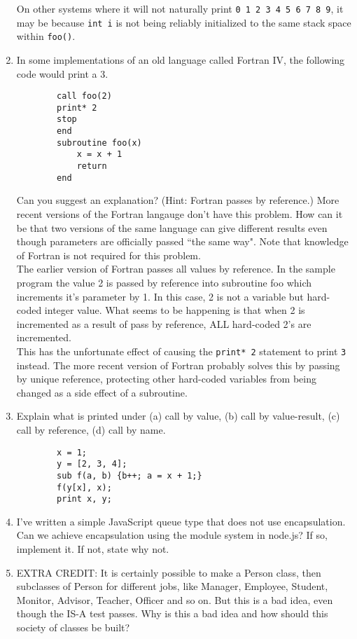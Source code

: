 \documentclass{article}
\begin{document}
\begin{enumerate}
	On other systems where it will not naturally print \texttt{0 1 2 3 4 5 6 7 8 9}, it may be because \texttt{int i} is not being reliably initialized to the same stack space within \texttt{foo()}.
	
	\setcounter{enumi}{7}
	\pagebreak
	\item In some implementations of an old language called Fortran IV, the following code would print a 3. 
	\begin{verbatim} 
	    call foo(2)
	    print* 2
	    stop
	    end
	    subroutine foo(x)
	        x = x + 1
	        return
	    end
    \end{verbatim}
	Can you suggest an explanation? (Hint: Fortran passes by reference.) More recent versions of the Fortran langauge don't have this problem. How can it be that two versions of the same language can give different results even though parameters are officially passed ``the same way". Note that knowledge of Fortran is not required for this problem.\\[.25in]
	The earlier version of Fortran passes all values by reference. In the sample program the value 2 is passed by reference into subroutine foo which increments it's parameter by 1. In this case, 2 is not a variable but hard-coded integer value. What seems to be happening is that when 2 is incremented as a result of pass by reference, ALL hard-coded 2's are incremented. \\[.1in]
	This has the unfortunate effect of causing the \texttt{print* 2} statement to print \texttt{3} instead. The more recent version of Fortran probably solves this by passing by unique reference, protecting other hard-coded variables from being changed as a side effect of a subroutine.
	\setcounter{enumi}{9}
	\pagebreak
	\item Explain what is printed under (a) call by value, (b) call by value-result, (c) call by reference, (d) call by name.
	\begin{verbatim}
		x = 1;
		y = [2, 3, 4];
		sub f(a, b) {b++; a = x + 1;}
		f(y[x], x);
		print x, y;
	\end{verbatim}
	\pagebreak
	\item I've written a simple JavaScript queue type that does not use encapsulation. Can we achieve encapsulation using the module system in node.js? If so, implement it. If not, state why not.
	\pagebreak
	\item EXTRA CREDIT: It is certainly possible to make a Person class, then subclasses of Person for different jobs, like Manager, Employee, Student, Monitor, Advisor, Teacher, Officer and so on. But this is a bad idea, even though the IS-A test passes. Why is this a bad idea and how should this society of classes be built?

\end{enumerate}
\end{document}
